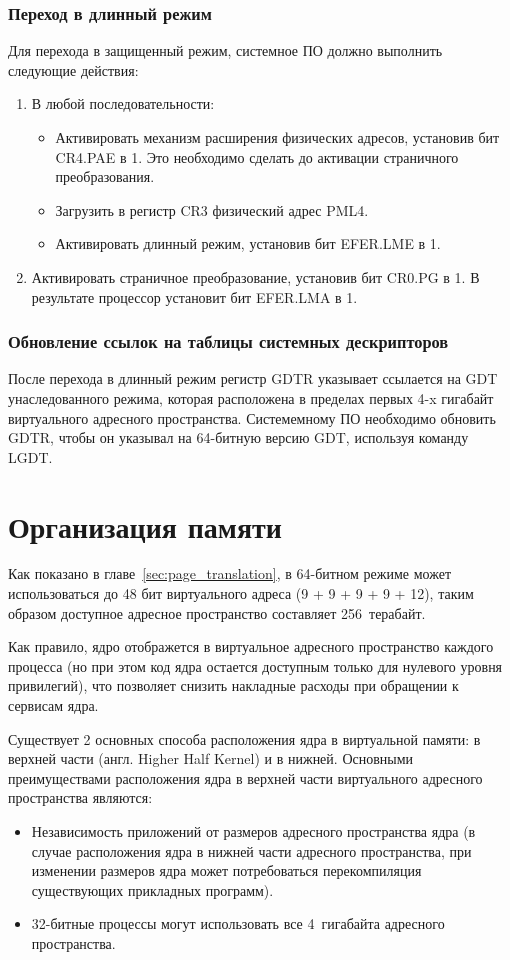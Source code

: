 \subsubsection*{Переход в длинный режим}
Для перехода в защищенный режим, системное ПО должно выполнить следующие действия:
\begin{enumerate}[1.]
\item В любой последовательности:
	\begin{itemize}
	\item Активировать механизм расширения физических адресов, установив бит CR4.PAE в 1. Это
		необходимо сделать до активации страничного преобразования.
	\item Загрузить в регистр CR3 физический адрес PML4.
	\item Активировать длинный режим, установив бит EFER.LME в 1.
	\end{itemize}
\item Активировать страничное преобразование, установив бит CR0.PG в 1. В результате процессор установит бит EFER.LMA в 1.
\end{enumerate}

\subsubsection*{Обновление ссылок на таблицы системных дескрипторов}
После перехода в длинный режим регистр GDTR указывает ссылается на GDT унаследованного режима, которая расположена
в пределах первых 4-x гигабайт виртуального адресного пространства. Системемному ПО необходимо обновить GDTR, чтобы
он указывал на 64-битную версию GDT, используя команду LGDT.


\section{Организация памяти}
Как показано в главе~\ref{sec:page_translation}, в 64-битном режиме может использоваться
до 48 бит виртуального адреса (9 + 9 + 9 + 9 + 12), таким образом доступное адресное пространство
составляет 256~терабайт.

Как правило, ядро отображется в виртуальное адресного пространство каждого процесса (но при этом код ядра
остается доступным только для нулевого уровня привилегий), что позволяет снизить накладные расходы при
обращении к сервисам ядра.

Существует 2 основных способа расположения ядра в виртуальной памяти: в верхней части (англ. Higher Half Kernel)
и в нижней. Основными преимуществами расположения ядра в верхней части виртуального адресного пространства являются:
\begin{itemize}
\item Независимость приложений от размеров адресного пространства ядра (в случае расположения ядра в нижней части
	адресного пространства, при изменении размеров ядра может потребоваться перекомпиляция существующих
	прикладных программ).
\item 32-битные процессы могут использовать все 4~гигабайта адресного пространства.
\end{itemize}

